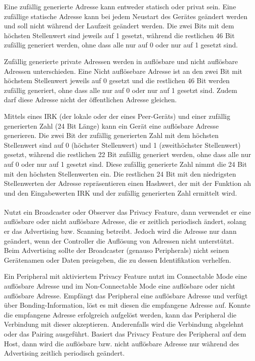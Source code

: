 Eine zufällig generierte Adresse kann entweder statisch oder privat sein. Eine zufällige statische Adresse kann bei jedem Neustart des Gerätes geändert werden und soll nicht während der Laufzeit geändert werden. Die zwei Bits mit dem höchsten Stellenwert sind jeweils auf 1 gesetzt, während die restlichen 46 Bit zufällig generiert werden, ohne dass alle nur auf 0 oder nur auf 1 gesetzt sind.

Zufällig generierte private Adressen werden in auflösbare und nicht auflösbare Adressen unterschieden. Eine Nicht auflösebare Adresse ist an den zwei Bit mit höchstem Stellenwert jeweils auf 0 gesetzt und die restlichen 46 Bit werden zufällig generiert, ohne dass alle nur auf 0 oder nur auf 1 gesetzt sind. Zudem darf diese Adresse nicht der öffentlichen Adresse gleichen.

Mittels eines IRK (der lokale oder der eines Peer-Geräts) und einer zufällig generierten Zahl (24 Bit Länge) kann ein Gerät eine auflösbare Adresse generieren. Die zwei Bit der zufällig generierten Zahl mit dem höchsten Stellenwert sind auf 0 (höchster Stellenwert) und 1 (zweithöchster Stellenwert) gesetzt, während die restlichen 22 Bit zufällig generiert werden, ohne dass alle nur auf 0 oder nur auf 1 gesetzt sind. Diese zufällig generierte Zahl nimmt die 24 Bit mit den höchsten Stellenwerten ein. Die restlichen 24 Bit mit den niedrigsten Stellenwerten der Adresse repräsentieren einen Hashwert, der mit der Funktion ah \cite{BtSpec4.2_2287} 
und den Eingabewerten IRK und der zufällig generierten Zahl ermittelt wird. \cite{BtSpec4.2_2577-2579}
\\\\

Nutzt ein Broadcaster oder Observer das Privacy Feature, dann verwendet er eine auflösbare oder nicht auflösbare Adresse, die er zeitlich periodisch ändert, solang er das Advertising bzw. Scanning betreibt. Jedoch wird die Adresse nur dann geändert, wenn der Controller die Auflösung von Adressen nicht unterstützt. Beim Advertising sollte der Broadcaster (genauso Peripherals) nicht seinen Gerätenamen oder Daten preisgeben, die zu dessen Identifikation verhelfen. \cite{BtSpec4.2_2078-2079}

Ein Peripheral mit aktiviertem Privacy Feature nutzt im Connectable Mode eine auflösbare Adresse und im Non-Connectable Mode eine auflösbare oder nicht auflösbare Adresse. Empfängt das Peripheral eine auflösbare Adresse und verfügt über Bonding-Information, löst es mit diesen die empfangene Adresse auf. Konnte die empfangene Adresse erfolgreich aufgelöst werden, kann das Peripheral die Verbindung mit dieser akzeptieren. Anderenfalls wird die Verbindung abgelehnt oder das Pairing ausgeführt. Basiert das Privacy Feature des Peripheral auf dem Host, dann wird die auflösbare bzw. nicht auflösbare Adresse nur während des Advertising zeitlich periodisch geändert. \cite{BtSpec4.2_2077}


